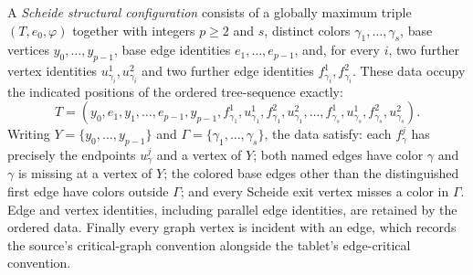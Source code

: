 \begin{definition}
A \emph{Scheide structural configuration} consists of a globally maximum
triple $(T,e_0,\varphi)$ together with integers $p\geq2$ and $s$, distinct
colors $\gamma_1,\ldots,\gamma_s$, base vertices
$y_0,\ldots,y_{p-1}$, base edge identities
$e_1,\ldots,e_{p-1}$, and, for every $i$, two further vertex identities
$u^1_{\gamma_i},u^2_{\gamma_i}$ and two further edge identities
$f^1_{\gamma_i},f^2_{\gamma_i}$.  These data occupy the indicated positions
of the ordered tree-sequence exactly:
\[
 T=(y_0,e_1,y_1,\ldots,e_{p-1},y_{p-1},
 f^1_{\gamma_1},u^1_{\gamma_1},f^2_{\gamma_1},u^2_{\gamma_1},\ldots,
 f^1_{\gamma_s},u^1_{\gamma_s},f^2_{\gamma_s},u^2_{\gamma_s}).
\]
Writing $Y=\{y_0,\ldots,y_{p-1}\}$ and
$\Gamma=\{\gamma_1,\ldots,\gamma_s\}$, the data satisfy:
each $f^j_\gamma$ has precisely the endpoints $u^j_\gamma$ and a vertex
of $Y$; both named edges have color $\gamma$ and $\gamma$ is missing at a
vertex of $Y$; the colored base edges other than the distinguished first
edge have colors outside $\Gamma$; and every Scheide exit vertex misses a
color in $\Gamma$.  Edge and vertex identities, including parallel edge
identities, are retained by the ordered data.  Finally every graph vertex
is incident with an edge, which records the source's critical-graph
convention alongside the tablet's edge-critical convention.
\end{definition}
